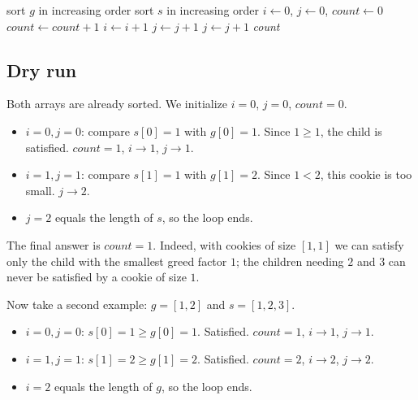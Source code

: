 \begin{algorithm}[H]
\caption{Assign Cookies}
\begin{algorithmic}[1]
  \State sort $g$ in increasing order
  \State sort $s$ in increasing order
  \State $i \gets 0$, $j \gets 0$, $\textit{count} \gets 0$
      \State $\textit{count} \gets \textit{count} + 1$
      \State $i \gets i + 1$
      \State $j \gets j + 1$
    \Else
      \State $j \gets j + 1$
    \EndIf
  \EndWhile
  \State \Return \textit{count}
\EndProcedure
\end{algorithmic}
\end{algorithm}

\subsection*{Dry run}


Both arrays are already sorted. We initialize $i = 0$, $j = 0$,
$\textit{count} = 0$.

\begin{itemize}
  \item $i=0, j=0$: compare $s[0]=1$ with $g[0]=1$. Since $1 \ge 1$, the
        child is satisfied. $\textit{count} = 1$, $i \to 1$, $j \to 1$.
  \item $i=1, j=1$: compare $s[1]=1$ with $g[1]=2$. Since $1 < 2$, this
        cookie is too small. $j \to 2$.
  \item $j = 2$ equals the length of $s$, so the loop ends.
\end{itemize}

The final answer is $\textit{count} = 1$. Indeed, with cookies of size
$[1,1]$ we can satisfy only the child with the smallest greed factor $1$; the
children needing $2$ and $3$ can never be satisfied by a cookie of size $1$.

Now take a second example: $g = [1, 2]$ and $s = [1, 2, 3]$.

\begin{itemize}
  \item $i=0, j=0$: $s[0]=1 \ge g[0]=1$. Satisfied. $\textit{count}=1$,
        $i \to 1$, $j \to 1$.
  \item $i=1, j=1$: $s[1]=2 \ge g[1]=2$. Satisfied. $\textit{count}=2$,
        $i \to 2$, $j \to 2$.
  \item $i = 2$ equals the length of $g$, so the loop ends.
\end{itemize}

